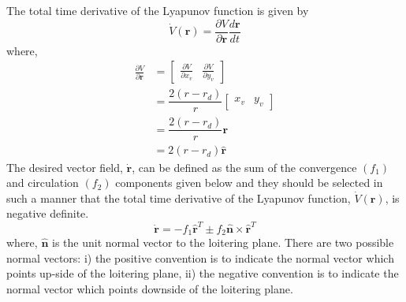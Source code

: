 \documentclass[Afour,sagev,times]{sagej}
\begin{document}
The total time derivative of the Lyapunov function is given by
\begin{equation}
\dot{V}(\boldsymbol{r})=\frac{\partial V}{\partial \boldsymbol{r}}\frac{d\boldsymbol{r}}{dt}
\end{equation} where,
\begin{equation} \label{partial}
\begin{split}
\frac{\partial V}{\partial \boldsymbol{r}} &= \begin{bmatrix}
\frac{\partial V}{\partial x_{v}} &\frac{\partial V}{\partial y_{v}} 
\end{bmatrix} \\
& = \dfrac{2(r-r_{d})}{r}\begin{bmatrix}
x_{v} &y_{v}
\end{bmatrix}\\
& = \dfrac{2(r-r_{d})}{r}\boldsymbol{r}\\
& = 2(r-r_{d})\hat{\boldsymbol{r}}
\end{split}
\end{equation}
The desired vector field, $\dot{\boldsymbol{r}}$, can be defined as the sum of the convergence $({f_1})$ and circulation $({f_2})$ components given below and they should be selected in such a manner that the total time derivative of the Lyapunov function, $\dot{V}(\boldsymbol{r})$, is negative definite.
\begin{equation}\label{rdot1}
\dot{\boldsymbol{r}} =- {f_1}\hat{\boldsymbol{r}}^{T}\pm {f_2}\hat{\boldsymbol{n}} \times \hat{\boldsymbol{r}}^{T}
\end{equation} where, $\hat{\boldsymbol{n}}$ is the unit normal vector to the loitering plane.  There are two possible normal vectors: i) the positive convention is to indicate the normal vector which points up-side of the loitering plane, ii) the negative convention is to indicate the normal vector which points downside of the loitering plane.
\end{document}
